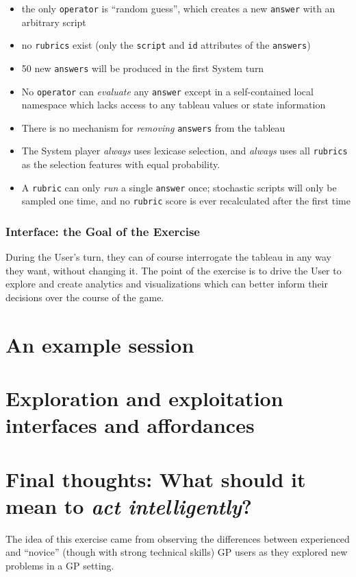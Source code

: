 \begin{itemize}
\item the only {\tt operator} is ``random guess'', which creates a new {\tt answer} with an arbitrary script
\item no {\tt rubrics} exist (only the {\tt script} and {\tt id} attributes of the {\tt answers})
\item 50 new {\tt answers} will be produced in the first System turn
\item No {\tt operator} can \emph{evaluate} any {\tt answer} except in a self-contained local namespace which lacks access to any tableau values or state information
\item There is no mechanism for \emph{removing} {\tt answers} from the tableau
\item The System player \emph{always} uses lexicase selection, and \emph{always} uses all {\tt rubrics} as the selection features with equal probability.
\item A {\tt rubric} can only \emph{run} a single {\tt answer} once; stochastic scripts will only be sampled one time, and no {\tt rubric} score is ever recalculated after the first time
\end{itemize}

\subsubsection{Interface: the Goal of the Exercise}\hypertarget{interface-the-goal-of-the-exercise}{}\label{interface-the-goal-of-the-exercise}

During the User's turn, they can of course interrogate the tableau in any way they want, without changing it. The point of the exercise is to drive the User to explore and create analytics and visualizations which can better inform their decisions over the course of the game.

\section{An example session}\hypertarget{an-example-session}{}\label{an-example-session}

\section{Exploration and exploitation interfaces and affordances}\hypertarget{exploration-and-exploitation-interfaces-and-affordances}{}\label{exploration-and-exploitation-interfaces-and-affordances}

\section{Final thoughts: What should it mean to \emph{act intelligently}?}\hypertarget{final-thoughts-what-should-it-mean-to-act-intelligently}{}\label{final-thoughts-what-should-it-mean-to-act-intelligently}

The idea of this exercise came from observing the differences between experienced and ``novice'' (though with strong technical skills) GP users as they explored new problems in a GP setting.

